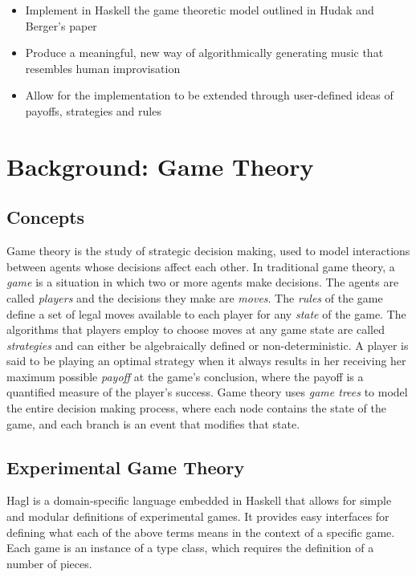 \documentclass{article}
\begin{document}
\begin{itemize}
\itemsep1pt\parskip0pt
\item
  Implement in Haskell the game theoretic model outlined in Hudak and Berger's
  paper
\item
  Produce a meaningful, new way of algorithmically generating music that
  resembles human improvisation
\item
  Allow for the implementation to be extended through user-defined ideas
  of payoffs, strategies and rules
\end{itemize}

\section{Background: Game Theory}

\subsection{Concepts}
Game theory is the study of strategic decision making, used to model
interactions between agents whose decisions affect each other. In
traditional game theory, a \emph{game} is a situation in which two or
more agents make decisions. The agents are called \emph{players} and the
decisions they make are \emph{moves}. The \emph{rules} of the game
define a set of legal moves available to each player for any
\emph{state} of the game. The algorithms that players employ to choose
moves at any game state are called \emph{strategies} and can either be
algebraically defined or non-deterministic. A player is said to be
playing an optimal strategy when it always results in her receiving her
maximum possible \emph{payoff} at the game's conclusion, where the
payoff is a quantified measure of the player's success. Game theory uses
\emph{game trees} to model the entire decision making process, where
each node contains the state of the game, and each branch is an event
that modifies that state.

\subsection{Experimental Game Theory}
Hagl is a domain-specific language embedded in Haskell that allows for
simple and modular definitions of experimental games.\cite{gametheorythesis, gametheory}  It provides easy interfaces for
defining what each of the above terms means in the context of a specific
game. Each game is an instance of a type class, which requires the
definition of a number of pieces.
\end{document}
